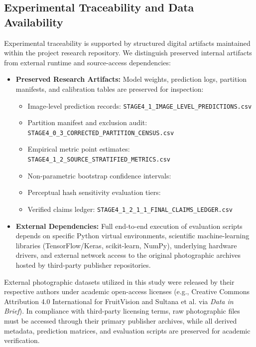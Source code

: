 \subsection{Experimental Traceability and Data Availability}
\label{sec:reproducibility_data}

Experimental traceability is supported by structured digital artifacts maintained within the project research repository. We distinguish preserved internal artifacts from external runtime and source-access dependencies:
\begin{itemize}
\item \textbf{Preserved Research Artifacts:} Model weights, prediction logs, partition manifests, and calibration tables are preserved for inspection:
\begin{itemize}
\item Image-level prediction records: {\small\nolinkurl{STAGE4_1_IMAGE_LEVEL_PREDICTIONS.csv}}
\item Partition manifest and exclusion audit: {\small\nolinkurl{STAGE4_0_3_CORRECTED_PARTITION_CENSUS.csv}}
\item Empirical metric point estimates: {\small\nolinkurl{STAGE4_1_2_SOURCE_STRATIFIED_METRICS.csv}}
\item Non-parametric bootstrap confidence intervals: 
\item Perceptual hash sensitivity evaluation tiers: 
\item Verified claims ledger: {\small\nolinkurl{STAGE4_1_2_1_1_FINAL_CLAIMS_LEDGER.csv}}
\end{itemize}
\item \textbf{External Dependencies:} Full end-to-end execution of evaluation scripts depends on specific Python virtual environments, scientific machine-learning libraries (TensorFlow/Keras, scikit-learn, NumPy), underlying hardware drivers, and external network access to the original photographic archives hosted by third-party publisher repositories.
\end{itemize}

External photographic datasets utilized in this study were released by their respective authors under academic open-access licenses (e.g., Creative Commons Attribution 4.0 International for FruitVision \cite{bijoy2025fruitvision} and Sultana et al. \cite{sultana2022extensive} via \textit{Data in Brief}). In compliance with third-party licensing terms, raw photographic files must be accessed through their primary publisher archives, while all derived metadata, prediction matrices, and evaluation scripts are preserved for academic verification.
